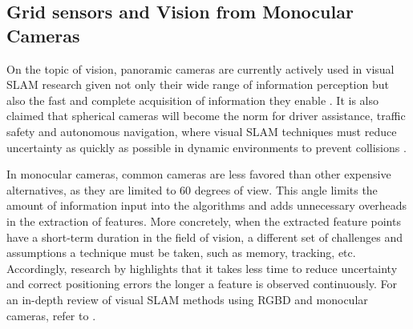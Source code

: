 \subsection{Grid sensors and Vision from Monocular Cameras}\label{chap:3:gridsensors}
On the topic of vision, panoramic cameras are currently actively used in visual SLAM research given not only their wide range of information perception but also the fast and complete acquisition of information they enable \cite{rill2021collision, wojek2012monocular}.
It is also claimed that spherical cameras will become the norm for driver assistance, traffic safety and autonomous navigation, where visual SLAM techniques must reduce uncertainty as quickly as possible in dynamic environments to prevent collisions \cite{zhang2021panoramic}.



In monocular cameras, common cameras are less favored than other expensive alternatives, as they are limited to 60 degrees of view.
This angle limits the amount of information input into the algorithms and adds unnecessary overheads in the extraction of features. More concretely, when the extracted feature points have a short-term duration in the field of vision, a different set of challenges and assumptions a technique must be taken, such as memory, tracking, etc. 
Accordingly, research by \textcite{davison2007monoslam} highlights that it takes less time to reduce uncertainty and correct positioning errors the longer a feature is observed continuously. For an in-depth review of visual SLAM methods using RGBD and monocular cameras, refer to \cite{taketomi2017visual, zhang2021panoramic}. 




